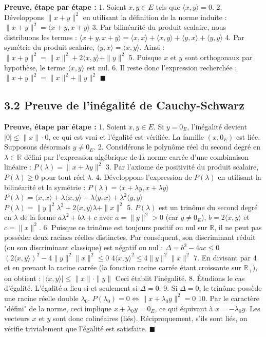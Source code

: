\documentclass{report}
\begin{document}
\textbf{Preuve, étape par étape :}
1. Soient $x, y \in E$ tels que $\langle x, y \rangle = 0$.
2. Développons $\|x + y\|^2$ en utilisant la définition de la norme induite :
   $ \|x + y\|^2 = \langle x + y, x + y \rangle $
3. Par bilinéarité du produit scalaire, nous distribuons les termes :
   $ \langle x + y, x + y \rangle = \langle x, x \rangle + \langle x, y \rangle + \langle y, x \rangle + \langle y, y \rangle $
4. Par symétrie du produit scalaire, $\langle y, x \rangle = \langle x, y \rangle$. Ainsi :
   $ \|x + y\|^2 = \|x\|^2 + 2\langle x, y \rangle + \|y\|^2 $
5. Puisque $x$ et $y$ sont orthogonaux par hypothèse, le terme $\langle x, y \rangle$ est nul.
6. Il reste donc l'expression recherchée :
   $ \|x + y\|^2 = \|x\|^2 + \|y\|^2 $
   $\blacksquare$

\subsection*{3.2 Preuve de l'inégalité de Cauchy-Schwarz}

\textbf{Preuve, étape par étape :}
1. Soient $x, y \in E$. Si $y = 0_E$, l'inégalité devient $|0| \le \|x\| \cdot 0$, ce qui est vrai et l'égalité est vérifiée. La famille $(x, 0_E)$ est liée. Supposons désormais $y \neq 0_E$.
2. Considérons le polynôme réel du second degré en $\lambda \in \mathbb{R}$ défini par l'expression algébrique de la norme carrée d'une combinaison linéaire :
   $ P(\lambda) = \|x + \lambda y\|^2 $
3. Par l'axiome de positivité du produit scalaire, $P(\lambda) \ge 0$ pour tout réel $\lambda$.
4. Développons l'expression de $P(\lambda)$ en utilisant la bilinéarité et la symétrie :
   $ P(\lambda) = \langle x + \lambda y, x + \lambda y \rangle $
   $ P(\lambda) = \langle x, x \rangle + \lambda \langle x, y \rangle + \lambda \langle y, x \rangle + \lambda^2 \langle y, y \rangle $
   $ P(\lambda) = \|y\|^2 \lambda^2 + 2\langle x, y \rangle \lambda + \|x\|^2 $
5. $P(\lambda)$ est un trinôme du second degré en $\lambda$ de la forme $a\lambda^2 + b\lambda + c$ avec $a = \|y\|^2 > 0$ (car $y \neq 0_E$), $b = 2\langle x, y \rangle$ et $c = \|x\|^2$.
6. Puisque ce trinôme est toujours positif ou nul sur $\mathbb{R}$, il ne peut pas posséder deux racines réelles distinctes. Par conséquent, son discriminant réduit (ou son discriminant classique) est négatif ou nul :
   $ \Delta = b^2 - 4ac \le 0 $
   $ (2\langle x, y \rangle)^2 - 4\|y\|^2 \|x\|^2 \le 0 $
   $ 4\langle x, y \rangle^2 \le 4\|y\|^2 \|x\|^2 $
7. En divisant par 4 et en prenant la racine carrée (la fonction racine carrée étant croissante sur $\mathbb{R}_+$), on obtient :
   $ |\langle x, y \rangle| \le \|x\| \cdot \|y\| $
   Ceci établit l'inégalité.
8. Étudions le cas d'égalité. L'égalité a lieu si et seulement si $\Delta = 0$.
9. Si $\Delta = 0$, le trinôme possède une racine réelle double $\lambda_0$.
   $ P(\lambda_0) = 0 \iff \|x + \lambda_0 y\|^2 = 0 $
10. Par le caractère "défini" de la norme, ceci implique $x + \lambda_0 y = 0_E$, ce qui équivaut à $x = -\lambda_0 y$. Les vecteurs $x$ et $y$ sont donc colinéaires (liés). Réciproquement, s'ils sont liés, on vérifie trivialement que l'égalité est satisfaite.
    $\blacksquare$
\end{document}
